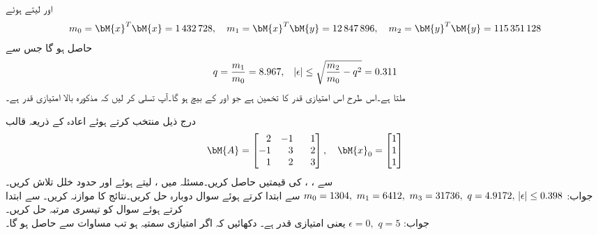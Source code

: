  اور  لیتے ہوئے
\begin{align*}
m_0=\bM{x}^T\bM{x}=\num{1432728}, \quad m_1=\bM{x}^T\bM{y}=\num{12847896}, \quad m_2=\bM{y}^T\bM{y}=\num{115351128}
\end{align*}
حاصل ہو گا جس سے
\begin{align*}
q=\frac{m_1}{m_0}=8.967,\quad \abs{\epsilon}\le \sqrt{\frac{m_2}{m_0}-q^2}=0.311
\end{align*}
ملتا ہے۔اس طرح  اس امتیازی قدر کا تخمین ہے جو  اور  کے بیچ ہو گا۔آپ تسلی کر لیں کہ مذکورہ بالا  امتیازی قدر  ہے۔ 


\quad
درج ذیل  منتخب کرتے ہوئے اعادہ کے ذریعہ  قالب 
\begin{align*}
\bM{A}=\begin{bmatrix*}[r]2&-1&\phantom{-}1\\-1&3&2\\1&2&3  \end{bmatrix*},\quad \bM{x}_0=\begin{bmatrix} 1\\1\\1 \end{bmatrix}
\end{align*}
سے ، ،  کی قیمتیں حاصل کریں۔مسئلہ  میں ،  لیتے ہوئے  اور حدود خلل  تلاش کریں۔\\
جواب:\quad
$m_0=1304,\,\, m_1=6412,\,\, m_3=31736,\,\, q=4.9172,\,\, \abs{\epsilon}\le 0.398$
\quad
{} سے ابتدا کرتے ہوئے سوال  دوبارہ حل کریں۔نتائج کا موازنہ کریں۔ 
\quad
{} سے ابتدا کرتے ہوئے سوال  کو تیسری مرتبہ حل کریں۔\\
جواب:\quad
$\epsilon=0,\,\,q=5$
یعنی  امتیازی قدر ہے۔
\quad
دکھائیں کہ اگر  امتیازی سمتیہ ہو تب مساوات  سے  حاصل ہو گا۔
\quad
